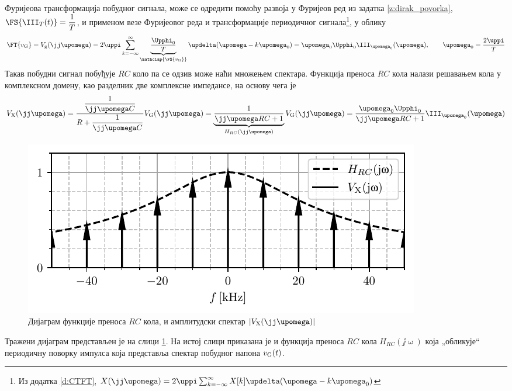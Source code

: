 Фуријеова трансформација побудног сигнала, може се одредити помоћу развоја у Фуријеов ред из
задатка \ref{z:dirak_povorka}, $\FS{\III_T(t)} = \dfrac{1}{T}$, и применом везе Фуријеовог  
реда и трансформације периодичног сигнала\footnote{Из додатка
\ref{d:CTFT}, 
$
X(\jj\upomega) = 2\uppi \sum_{k = -\infty}^{\infty} X[k] \updelta( \upomega - k \upomega_{\rm 0} )
$
}, у облику 
\begin{equation}
    \FT{v_{\rm G}} = V_{\rm g}(\jj\upomega) = 2\uppi  \sum_{k = -\infty}^{\infty} \underbrace{\dfrac{\Upphi_0}{T}}_{\mathclap{\FS{v_{\rm G}}}} \updelta( \upomega - k \upomega_{\rm 0} )
    = {\upomega_0 \Upphi_0}\III_{\upomega_0}(\upomega), \qquad \upomega_0 = \dfrac{2\uppi}{T}
\end{equation}
Такав побудни сигнал побуђује $RC$ коло па се одзив може наћи множењем спектара. 
Функција преноса $RC$ кола налази решавањем кола у комплексном домену, 
као разделник две комплексне импедансе, на основу чега је  
\begin{eqnarray}
    V_{\rm X}(\jj\upomega) = \dfrac{ \dfrac{1}{\jj\upomega C} }{ R + \dfrac{1}{\jj\upomega C} } V_{\rm G}(\jj\upomega)
                           = \underbrace{\dfrac{ 1 }{ \jj\upomega RC + 1 }}_{H_{RC}(\jj\upomega)} V_{\rm G}(\jj\upomega)
                           = \dfrac{ {\upomega_0 \Upphi_0} }{ \jj\upomega RC + 1 } \III_{\upomega_0}(\upomega)
\end{eqnarray}
%
\begin{figure}
    \centering
    \includegraphics{fig/comb_snaga_result.pdf}
    \caption{Дијаграм функције преноса $RC$ кола, и амплитудски спектар $|V_{\rm X}(\jj\upomega)|$ }
    \label{fig:\ID.vx}
\end{figure}
%
Тражени дијаграм представљен је на слици \ref{fig:\ID.vx}. На истој слици приказана је и функција преноса $RC$ кола
$H_{RC}(\jj\upomega)$ која „обликује“ периодичну поворку импулса која представља спектар побудног напона $v_{\rm G}(t)$.

